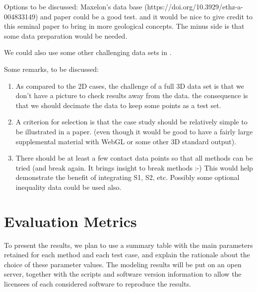 \documentclass[final]{ring20}
\begin{document}

Options to be discussed: Maxelon's data base (https://doi.org/10.3929/ethz-a-004833149) and paper \citep{Maxelon2009CG} could be a good test. and it would be nice to give credit to this seminal paper to bring in more geological concepts. The minus side is that some data preparation would be needed. 

We could also use some other challenging data sets in \citep{Laurent2016EaPSL,Grose2019JoSG,Sprague2005Ga}. 

Some remarks, to be discussed: 
\begin{enumerate}
\item As compared to the 2D cases, the challenge of a full 3D data set is that we don't have a picture to check results away from the data. the consequence is that we should decimate the data to keep some points as a test set. 

\item A criterion for selection is that the case study should be relatively simple to be illustrated in a paper. (even though it would be good to have a fairly large supplemental material with WebGL or some other 3D standard output). 

\item There should be at least a few contact data points so that all methods can be tried (and break again. It brings insight to break methods :-) 
This would help demonstrate the benefit of integrating S1, S2, etc. Possibly some optional inequality data could be used also. 

\end{enumerate}

\section{Evaluation Metrics}\label{sec:results}



To present the results, we plan to use a summary table with the main parameters retained for each method and each test case, and explain the rationale about the choice of these parameter values. The modeling results will be put on an open server, together with the scripts and software version information to allow the licensees of each considered software to reproduce the results. 
\end{document}
